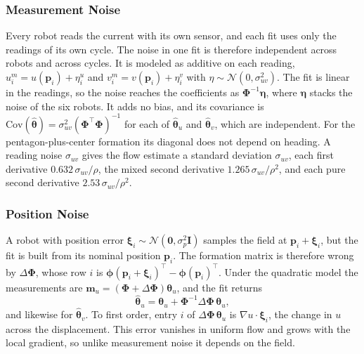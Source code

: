\documentclass[lettersize,journal]{IEEEtran}
\newcommand{\rev}[1]{#1}
\begin{document}
\subsubsection{Measurement Noise}
Every robot reads the current with its own sensor, and each fit uses only
the readings of its own cycle. The noise in one fit is therefore
independent across robots and across cycles. It is modeled as additive on
each reading, $u_i^m = u(\mathbf{p}_i) + \eta_i^u$ and
$v_i^m = v(\mathbf{p}_i) + \eta_i^v$ with
$\eta \sim \mathcal{N}(0, \sigma_{uv}^2)$. The fit is linear in the
readings, so the noise reaches the coefficients as
$\boldsymbol{\Phi}^{-1}\boldsymbol{\eta}$, where $\boldsymbol{\eta}$
stacks the noise of the six robots. It adds no bias, and its covariance is
$\mathrm{Cov}(\hat{\boldsymbol{\theta}}) =
\sigma_{uv}^2(\boldsymbol{\Phi}^\top\boldsymbol{\Phi})^{-1}$ for each of
$\hat{\boldsymbol{\theta}}_u$ and $\hat{\boldsymbol{\theta}}_v$, which
are independent. For the pentagon-plus-center formation its diagonal does
not depend on heading. A reading noise $\sigma_{uv}$ gives the flow estimate a standard deviation
$\sigma_{uv}$, each first derivative $\rev{0.632}\,\sigma_{uv}/\rho$, the
mixed second derivative $\rev{1.265}\,\sigma_{uv}/\rho^2$, and each pure
second derivative $\rev{2.53}\,\sigma_{uv}/\rho^2$.

\subsubsection{Position Noise}
A robot with position error
$\boldsymbol{\xi}_i \sim \mathcal{N}(\mathbf{0}, \sigma_p^2\mathbf{I})$
samples the field at $\mathbf{p}_i + \boldsymbol{\xi}_i$, but the fit is
built from its nominal position $\mathbf{p}_i$. The formation matrix is
therefore wrong by $\Delta\boldsymbol{\Phi}$, whose row $i$ is
$\boldsymbol{\phi}(\mathbf{p}_i + \boldsymbol{\xi}_i)^{\top} -
\boldsymbol{\phi}(\mathbf{p}_i)^{\top}$. Under the quadratic model the
measurements are
$\mathbf{m}_u = (\boldsymbol{\Phi} + \Delta\boldsymbol{\Phi})
\boldsymbol{\theta}_u$, and the fit returns
\begin{equation}
    \hat{\boldsymbol{\theta}}_u = \boldsymbol{\theta}_u
        + \boldsymbol{\Phi}^{-1}\Delta\boldsymbol{\Phi}\,
          \boldsymbol{\theta}_u ,
    \label{eq:pos_noise}
\end{equation}
and likewise for $\hat{\boldsymbol{\theta}}_v$. To first order, entry
$i$ of $\Delta\boldsymbol{\Phi}\,\boldsymbol{\theta}_u$ is
$\nabla u \cdot \boldsymbol{\xi}_i$, the change in $u$ across the
displacement. This error vanishes in uniform flow and grows with the
local gradient, so unlike measurement noise it depends on the field.
\end{document}
